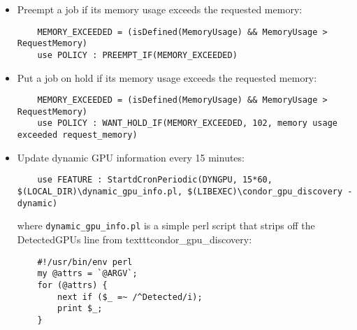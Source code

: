 \begin{itemize}
\item Preempt a job if its memory usage exceeds the requested memory:
    \begin{verbatim}
	MEMORY_EXCEEDED = (isDefined(MemoryUsage) && MemoryUsage > RequestMemory)
	use POLICY : PREEMPT_IF(MEMORY_EXCEEDED)
    \end{verbatim}

\item Put a job on hold if its memory usage exceeds the requested memory:
    \begin{verbatim}
	MEMORY_EXCEEDED = (isDefined(MemoryUsage) && MemoryUsage > RequestMemory)
	use POLICY : WANT_HOLD_IF(MEMORY_EXCEEDED, 102, memory usage exceeded request_memory)
    \end{verbatim}

\item Update dynamic GPU information every 15 minutes:

    \begin{verbatim}
	use FEATURE : StartdCronPeriodic(DYNGPU, 15*60, $(LOCAL_DIR)\dynamic_gpu_info.pl, $(LIBEXEC)\condor_gpu_discovery -dynamic)
    \end{verbatim}

where \texttt{dynamic\_gpu\_info.pl}  is a simple perl script that strips
off the DetectedGPUs line from texttt{condor\_gpu\_discovery}:

    \begin{verbatim}
	#!/usr/bin/env perl
	my @attrs = `@ARGV`;
	for (@attrs) {
		next if ($_ =~ /^Detected/i);
		print $_;
	}
    \end{verbatim}
\end{itemize}

